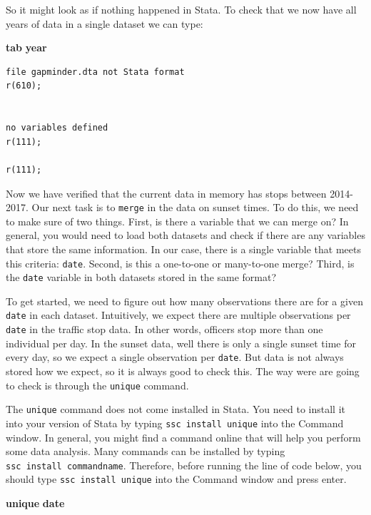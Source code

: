 \documentclass[
]{book}
\newenvironment{Shaded}{\begin{snugshade}}{\end{snugshade}}
\newcommand{\FunctionTok}[1]{\textcolor[rgb]{0.13,0.29,0.53}{\textbf{#1}}}
\newcommand{\KeywordTok}[1]{\textcolor[rgb]{0.13,0.29,0.53}{\textbf{#1}}}
\begin{document}
So it might look as if nothing happened in Stata. To check that we now have all years of data in a single dataset we can type:

\begin{Shaded}
\begin{Highlighting}[]
\KeywordTok{tab} \FunctionTok{year}
\end{Highlighting}
\end{Shaded}

\begin{verbatim}
file gapminder.dta not Stata format
r(610);


no variables defined
r(111);

r(111);
\end{verbatim}

Now we have verified that the current data in memory has stops between 2014-2017. Our next task is to \texttt{merge} in the data on sunset times. To do this, we need to make sure of two things. First, is there a variable that we can merge on? In general, you would need to load both datasets and check if there are any variables that store the same information. In our case, there is a single variable that meets this criteria: \texttt{date}. Second, is this a one-to-one or many-to-one merge? Third, is the \texttt{date} variable in both datasets stored in the same format?

To get started, we need to figure out how many observations there are for a given \texttt{date} in each dataset. Intuitively, we expect there are multiple observations per \texttt{date} in the traffic stop data. In other words, officers stop more than one individual per day. In the sunset data, well there is only a single sunset time for every day, so we expect a single observation per \texttt{date}. But data is not always stored how we expect, so it is always good to check this. The way were are going to check is through the \texttt{unique} command.

The \texttt{unique} command does not come installed in Stata. You need to install it into your version of Stata by typing \texttt{ssc\ install\ unique} into the Command window. In general, you might find a command online that will help you perform some data analysis. Many commands can be installed by typing \texttt{ssc\ install\ commandname}. Therefore, before running the line of code below, you should type \texttt{ssc\ install\ unique} into the Command window and press enter.

\begin{Shaded}
\begin{Highlighting}[]
\KeywordTok{unique} \FunctionTok{date}
\end{Highlighting}
\end{Shaded}
\end{document}

